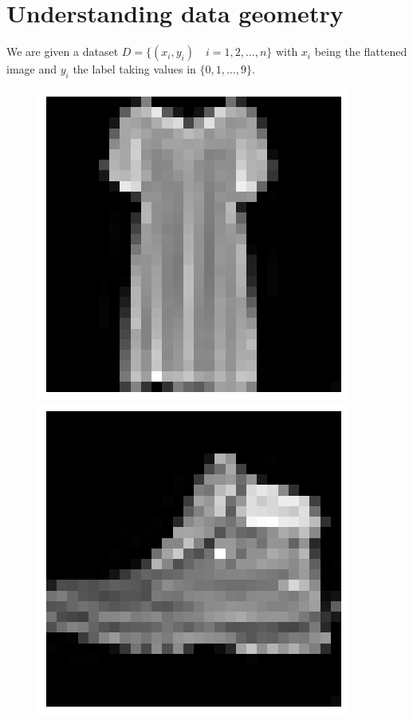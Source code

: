 \section{Understanding data geometry}
We are given a dataset $D = \{ (x_i, y_i) \quad i = 1, 2, \dots, n \}$ with $x_i$ being the flattened image and $y_i$ the label taking values in $\{ 0, 1, \dots, 9 \}$.

\begin{figure}[H]
    \centering
    \begin{minipage}{0.14\textwidth}
        \centering
        \includegraphics[width=\textwidth]{figures/dress.png}
    \end{minipage}
    \begin{minipage}{0.14\textwidth}
        \centering
        \includegraphics[width=\textwidth]{figures/shoe.png}

\end{minipage}
\end{figure}
